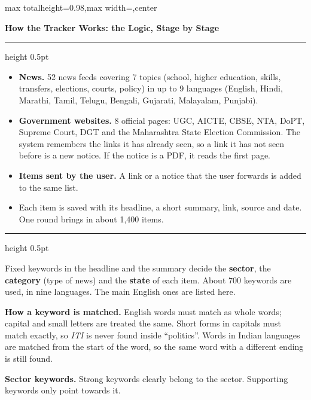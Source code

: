 \documentclass[10pt,a4paper]{article}
\newcommand{\stage}[2]{\vspace{7pt}{\large\bfseries Stage #1.\enspace #2}\par\nobreak\vspace{1pt}%
  \hrule height 0.5pt\nobreak\vspace{3pt}}
\newcommand{\kw}[1]{\textit{#1}}
\newcommand{\lbl}[1]{\textbf{#1}}
\begin{document}
\noindent
\begin{adjustbox}{max totalheight=0.98\textheight,max width=\textwidth,center}
\begin{minipage}{\textwidth}
\setlength{\parskip}{4pt}

{\LARGE\bfseries How the Tracker Works: the Logic, Stage by Stage}\par

\stage{1}{Collecting the news}

\begin{itemize}
  \item \lbl{News.} 52 news feeds covering 7 topics (school, higher education, skills, transfers, elections, courts, policy) in up to 9 languages (English, Hindi, Marathi, Tamil, Telugu, Bengali, Gujarati, Malayalam, Punjabi).
  \item \lbl{Government websites.} 8 official pages: UGC, AICTE, CBSE, NTA, DoPT, Supreme Court, DGT and the Maharashtra State Election Commission. The system remembers the links it has already seen, so a link it has not seen before is a new notice. If the notice is a PDF, it reads the first page.
  \item \lbl{Items sent by the user.} A link or a notice that the user forwards is added to the same list.
  \item Each item is saved with its headline, a short summary, link, source and date. One round brings in about 1,400 items.
\end{itemize}

\stage{2}{Finding the keywords}

Fixed keywords in the headline and the summary decide the \lbl{sector}, the \lbl{category} (type of news) and the \lbl{state} of each item. About 700 keywords are used, in nine languages. The main English ones are listed here.

\lbl{How a keyword is matched.} English words must match as whole words; capital and small letters are treated the same. Short forms in capitals must match exactly, so \kw{ITI} is never found inside ``politics''. Words in Indian languages are matched from the start of the word, so the same word with a different ending is still found.

\lbl{Sector keywords.} Strong keywords clearly belong to the sector. Supporting keywords only point towards it.


\end{minipage}
\end{adjustbox}
\end{document}
